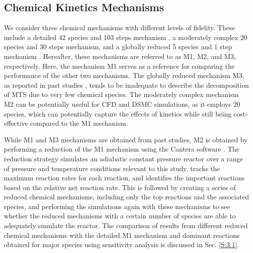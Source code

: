 \documentclass[final, letterpaper, square, comma, numbers, sort&compress]{elsarticle}
\begin{document}
\subsection{Chemical Kinetics Mechanisms}
\label{S:2.3}
We consider three chemical mechanisms with different levels of fidelity. These include a detailed 42 species and 103 steps mechanism \cite{Ge2007A,Ge2007B,Ge2010}, a moderately complex 20 species and 30 steps mechanism, and a globally reduced 5 species and 1 step mechanism \cite{Mousavipour2004}. Hereafter, these mechanisms are referred to as M1, M2, and M3, respectively. Here, the mechanism M1 serves as a reference for comparing the performance of the other two mechanisms. The globally reduced mechanism M3, as reported in past studies \cite{Dang2022,Mousavipour2004}, tends to be inadequate to describe the decomposition of MTS due to very few chemical species. The moderately complex mechanism M2 can be potentially useful for CFD and DSMC simulations, as it employs 20 species, which can potentially capture the effects of kinetics while still being cost-effective compared to the M1 mechanism. 

While M1 and M3 mechanisms are obtained from past studies, M2 is obtained by performing a reduction of the M1 mechanism using the Cantera software \cite{Goodwin2014}. The reduction strategy simulates an adiabatic constant pressure reactor over a range of pressure and temperature conditions relevant to this study, tracks the maximum reaction rates for each reaction, and identifies the important reactions based on the relative net reaction rate. This is followed by creating a series of reduced chemical mechanisms, including only the top reactions and the associated species, and performing the simulations again with these mechanisms to see whether the reduced mechanisms with a certain number of species are able to adequately simulate the reactor. The comparison of results from different reduced chemical mechanisms with the detailed M1 mechanism and dominant reactions obtained for major species using sensitivity analysis is discussed in Sec. \ref{S:3.1}.
\end{document}
